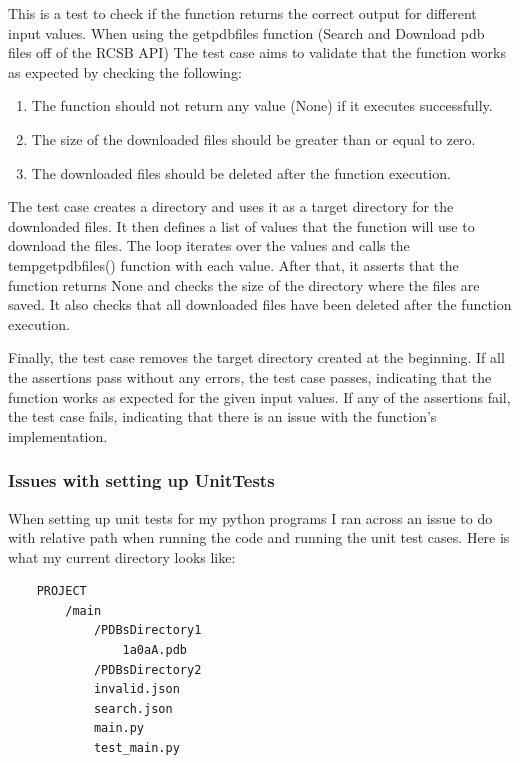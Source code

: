 \documentclass[]{final_report}
\begin{document}
This is a test to check if the function returns the correct output for different input values. When using the getpdbfiles function (Search and Download pdb files off of the RCSB API) The test case aims to validate that the function works as expected by checking the following:

\begin{enumerate}
    \item The function should not return any value (None) if it executes successfully.
    \item The size of the downloaded files should be greater than or equal to zero.
    \item The downloaded files should be deleted after the function execution.
\end{enumerate}

The test case creates a directory and uses it as a target directory for the downloaded files. It then defines a list of values that the function will use to download the files. The loop iterates over the values and calls the tempgetpdbfiles() function with each value. After that, it asserts that the function returns None and checks the size of the directory where the files are saved. It also checks that all downloaded files have been deleted after the function execution.

Finally, the test case removes the target directory created at the beginning. If all the assertions pass without any errors, the test case passes, indicating that the function works as expected for the given input values. If any of the assertions fail, the test case fails, indicating that there is an issue with the function's implementation.

\subsubsection{Issues with setting up UnitTests}

When setting up unit tests for my python programs I ran across an issue to do with relative path when running the code and running the unit test cases. Here is what my current directory looks like:

\begin{lstlisting}
    PROJECT
        /main
            /PDBsDirectory1
                1a0aA.pdb
            /PDBsDirectory2
            invalid.json
            search.json
            main.py
            test_main.py

\end{lstlisting}
\end{document}
